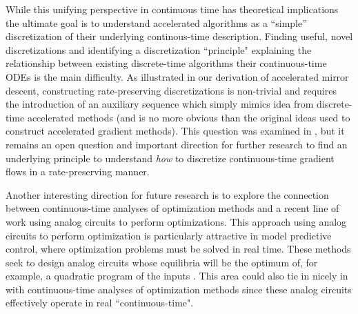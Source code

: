 While this unifying perspective in continuous time has theoretical implications the ultimate goal is to understand accelerated algorithms as a ``simple'' discretization of their underlying continous-time description. Finding useful, novel discretizations and identifying a discretization ``principle" explaining the relationship between existing discrete-time algorithms their continuous-time ODEs is the main difficulty. As illustrated in our derivation of accelerated mirror descent, constructing rate-preserving discretizations is non-trivial and requires the introduction of an auxiliary sequence which simply mimics idea from discrete-time accelerated methods (and is no more obvious than the original ideas used to construct accelerated gradient methods). This question was examined in \citet{wilson2016lyapunov}, but it remains an open question and important direction for further research to find an underlying principle to understand \textit{how} to discretize continuous-time gradient flows in a rate-preserving manner.

Another interesting direction for future research is to explore the connection between continuous-time analyses of optimization methods and a recent line of work using analog circuits to perform optimizations. This approach using analog circuits to perform optimization is particularly attractive in model predictive control, where optimization problems must be solved in real time. These methods seek to design analog circuits whose equilibria will be the optimum of, for example, a quadratic program of the inputs \citep{vichik2016stability}. This area could also tie in nicely in with continuous-time analyses of optimization methods since these analog circuits effectively operate in real ``continuous-time".

\begin{comment}
A recent work by \citet{wilson2016lyapunov} explores discretization possibilities for the general family of accelerated ODEs \ref{generalode}. By approaching the discretization as a combination of forward and backward Euler methods, there is a principled way to generate and analyze algorithms. While the careful discretization does result in algorithms that preserve the convergence rate under certain optimality conditions, the sub-problems involved in the backward Euler steps are intractable. Therefore, transforming the continuous time ODE system into a discrete-time algorithm that is both tractable and preserves the necessary properties remains elusive.


The difference observed between discrete algorithms and continuous time ODEs is not a surprise. After all, depending on the limiting factors, continuous time perspectives can lose interesting behavior seen in discrete time. This is particularly noticeable in the case of higher order methods: $p$th-order $p+1$ regularized methods are first order ODEs in their limit \citep{wibisono2016variational}. More broadly, it is well established it the theory of dynamical systems and complexity that while first order discrete-time system can display chaotic dynamics, continuous-time system must have at least three state space variables \citep{lorenz1992complex}.
\end{comment}


